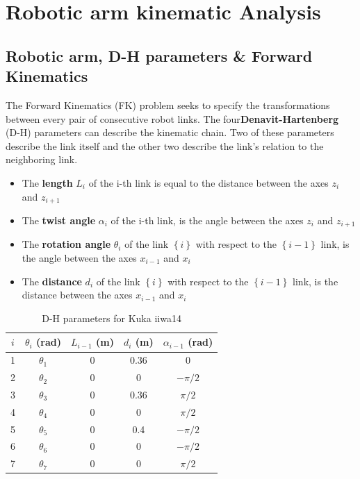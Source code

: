 \chapter{Robotic arm kinematic Analysis}


\section{Robotic arm, D-H parameters \& Forward Kinematics}

The Forward Kinematics (FK) problem seeks to specify the transformations between every pair of consecutive robot links. The four\textbf{Denavit-Hartenberg} (D-H) parameters can describe the kinematic chain. Two of these parameters describe the link itself and the other two describe the link's relation to the neighboring link.
%
\begin{itemize}
\item The \textbf{length} $L_i$ of the i-th link is equal to the distance between the axes $z_i$ and $z_{i+1}$
\item The \textbf{twist angle} $α_i$ of the i-th link, is the angle between the axes $z_i$ and $z_{i+1}$
\item The \textbf{rotation angle} $θ_i$ of the link $\left\lbrace i \right\rbrace $ with respect to the $\left\lbrace i-1 \right\rbrace$ link, is the angle 
between the axes $x_{i-1}$ and $x_i$
\item The \textbf{distance} $d_i$ of the link $\left\lbrace i \right\rbrace$ with respect to the $\left\lbrace i-1 \right\rbrace$ link, is the distance 
between the axes $x_{i-1}$ and $x_i$
\end{itemize}
\begin{table}[htbp]
\begin{center}
\begin{tabular}{ |c|c|c|c|c| } 
\hline
$i$ & $θ_i$ (rad) & $L_{i-1}$ (m) & $d_i$ (m) & $α_{i-1}$ (rad) \\
\hline
1 & $θ_1$ & 0 & 0.36 & 0 \\
2 & $θ_2$ & 0 & 0 & $-π/2$ \\
3 & $θ_3$ & 0 & 0.36 & $π/2$ \\
4 & $θ_4$ & 0 & 0 & $π/2$\\
5 & $θ_5$ & 0 & 0.4 & $-π/2$ \\
6 & $θ_6$ & 0 & 0 & $-π/2$ \\
7 & $θ_7$ & 0 & 0 & $π/2$ \\
\hline
\end{tabular}
\end{center}
\caption{D-H parameters for Kuka iiwa14}
\end{table}

